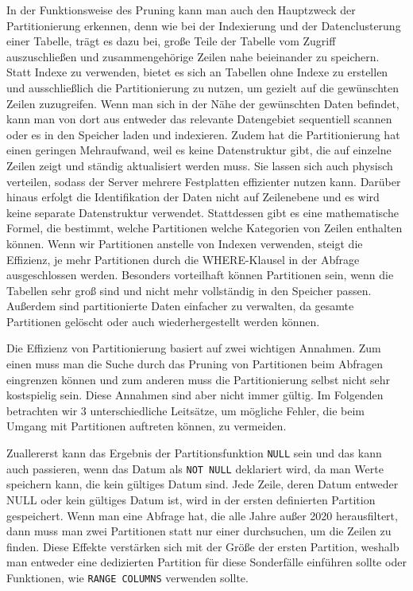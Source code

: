 In der Funktionsweise des Pruning kann man auch den Hauptzweck der Partitionierung erkennen, denn wie bei der Indexierung und der Datenclusterung einer Tabelle, trägt es dazu bei, große Teile der Tabelle vom Zugriff auszuschließen und zusammengehörige Zeilen nahe beieinander zu speichern.
Statt Indexe zu verwenden, bietet es sich an Tabellen ohne Indexe zu erstellen und ausschließlich die Partitionierung zu nutzen, um gezielt auf die gewünschten Zeilen zuzugreifen.
Wenn man sich in der Nähe der gewünschten Daten befindet, kann man von dort aus entweder das relevante Datengebiet sequentiell scannen oder es in den Speicher laden und indexieren.
Zudem hat die Partitionierung hat einen geringen Mehraufwand, weil es keine Datenstruktur gibt, die auf einzelne Zeilen zeigt und ständig aktualisiert werden muss.
Sie lassen sich auch physisch verteilen, sodass der Server mehrere Festplatten effizienter nutzen kann.
Darüber hinaus erfolgt die Identifikation der Daten nicht auf Zeilenebene und es wird keine separate Datenstruktur verwendet.
Stattdessen gibt es eine mathematische Formel, die bestimmt, welche Partitionen welche Kategorien von Zeilen enthalten können.
Wenn wir Partitionen anstelle von Indexen verwenden, steigt die Effizienz, je mehr Partitionen durch die WHERE-Klausel in der Abfrage ausgeschlossen werden.
Besonders vorteilhaft können Partitionen sein, wenn die Tabellen sehr groß sind und nicht mehr vollständig in den Speicher passen.
Außerdem sind partitionierte Daten einfacher zu verwalten, da gesamte Partitionen gelöscht oder auch wiederhergestellt werden können.

Die Effizienz von Partitionierung basiert auf zwei wichtigen Annahmen.
Zum einen muss man die Suche durch das Pruning von Partitionen beim Abfragen eingrenzen können und zum anderen muss die Partitionierung selbst nicht sehr kostspielig sein.
Diese Annahmen sind aber nicht immer gültig.
Im Folgenden betrachten wir 3 unterschiedliche Leitsätze, um mögliche Fehler, die beim Umgang mit Partitionen auftreten können, zu vermeiden.

Zuallererst kann das Ergebnis der Partitionsfunktion \texttt{NULL} sein und das kann auch passieren, wenn das Datum als \texttt{NOT NULL} deklariert wird, da man Werte speichern kann, die kein gültiges Datum sind.
Jede Zeile, deren Datum entweder NULL oder kein gültiges Datum ist, wird in der ersten definierten Partition gespeichert.
Wenn man eine Abfrage hat, die alle Jahre außer 2020 herausfiltert, dann muss man zwei Partitionen statt nur einer durchsuchen, um die Zeilen zu finden.
Diese Effekte verstärken sich mit der Größe der ersten Partition, weshalb man entweder eine dedizierten Partition für diese Sonderfälle einführen sollte oder Funktionen, wie \texttt{RANGE COLUMNS} verwenden sollte.

